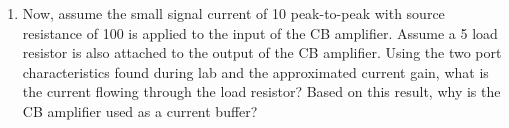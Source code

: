 \documentclass{article}
\begin{document}
\begin{enumerate}
	\item Now, assume the small signal current of \unit{10}{\micro\ampere} peak-to-peak with source resistance of \unit{100}{\ohm} is applied to the input of the CB amplifier. Assume a \unit{5}{\kilo\ohm} load resistor is also attached to the output of the CB amplifier. Using the two port characteristics found during lab and the approximated current gain, what is the current flowing through the load resistor? Based on this result, why is the CB amplifier used as a current buffer?
	\\~\\~\\~\\~\\~\\~\\~\\~\\
\end{enumerate}
\end{document}

